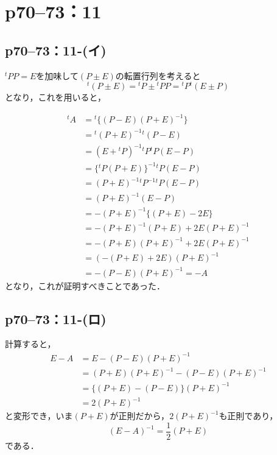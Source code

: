 \section*{p70--73：11}

\subsection*{p70--73：11-(イ)}

\begin{tproof}
  ${}^t PP =E$を加味して$(P \pm E)$の転置行列を考えると
  \[
    {}^t (P \pm E) = {}^t P \pm {}^t PP = {}^t P {}^t (E \pm P)
  \]
  となり，これを用いると，

  \begin{align*}
    {}^t A & ={}^t  \{ (P-E)(P+E)^{-1} \}            \\
           & = {}^t (P+E)^{-1} {}^t (P-E)            \\
           & = (E+{}^t P)^{-1} {}^t P {}^t P (E-P)   \\
           & = \{ {}^t P (P+E)  \}^{-1} {}^t P (E-P) \\
           & = (P+E)^{-1} {}^t P^{-1} {}^t P (E-P)   \\
           & = (P+E)^{-1} (E-P)                      \\
           & = -(P+E)^{-1} \{ (P+E)-2E \}            \\
           & = -(P+E)^{-1} (P+E) +2E (P+E)^{-1}      \\
           & = -(P+E) (P+E)^{-1} +2E (P+E)^{-1}      \\
           & = (-(P+E)+2E) (P+E)^{-1}                \\
           & = -(P-E) (P+E)^{-1} = -A
  \end{align*}
  となり，これが証明すべきことであった．
\end{tproof}


\subsection*{p70--73：11-(ロ)}

\begin{tproof}

  計算すると，
  \begin{align*}
    E-A & = E-(P-E) (P+E)^{-1}                 \\
        & = (P+E)(P+E)^{-1} - (P-E) (P+E)^{-1} \\
        & = \{ (P+E)-(P-E) \} (P+E)^{-1}       \\
        & = 2(P+E)^{-1}
  \end{align*}
  と変形でき，いま$(P+E)$が正則だから，$2(P+E)^{-1}$も正則であり，
  \[
    (E-A)^{-1} = \frac{1}{2} (P+E)
  \]
  である．
\end{tproof}


